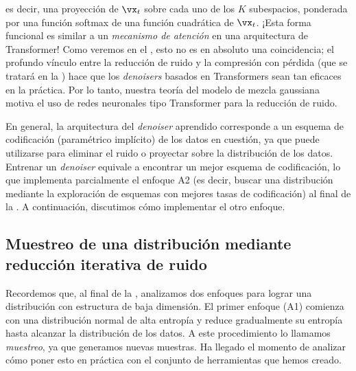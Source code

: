 \documentclass[../../book-main.tex]{subfiles}
\begin{document}
es decir, una proyección de \(\vx_{t}\) sobre cada uno de los \(K\) subespacios,
ponderada por una función softmax de una función cuadrática de \(\vx_{t}\). ¡Esta
forma funcional es similar a un \textit{mecanismo de atención} en una 
arquitectura de Transformer! Como veremos en el
, esto no es en absoluto una coincidencia; el profundo
vínculo entre la reducción de ruido y la compresión con pérdida (que se tratará en la
) hace que los \textit{denoisers} basados en Transformers sean tan
eficaces en la práctica. Por lo tanto, nuestra teoría del modelo de mezcla gaussiana
motiva el uso de redes neuronales tipo Transformer para la reducción de ruido.

En general, la arquitectura del \textit{denoiser} aprendido corresponde a un
esquema de codificación (paramétrico implícito) de los datos en cuestión, ya que puede
utilizarse para eliminar el ruido o proyectar sobre la distribución de los datos. Entrenar un
\textit{denoiser} equivale a encontrar un mejor esquema de codificación, lo que
implementa parcialmente el enfoque A2 (es decir, buscar una
distribución mediante la exploración de esquemas con mejores tasas de codificación) al
final de la . A continuación, discutimos cómo
implementar el otro enfoque.

\subsection{Muestreo de una distribución mediante
reducción iterativa de ruido}\label{sub:sampling_denoising}

Recordemos que, al final de la , analizamos dos
enfoques para lograr una distribución con estructura de baja dimensión.
El primer enfoque (A1) comienza con una distribución normal de alta
entropía y reduce gradualmente su entropía hasta alcanzar la distribución
de los datos. A este procedimiento lo llamamos \textit{muestreo}, ya que
generamos nuevas muestras. Ha llegado el momento de analizar cómo poner esto en práctica
con el conjunto de herramientas que hemos creado.
\end{document}
